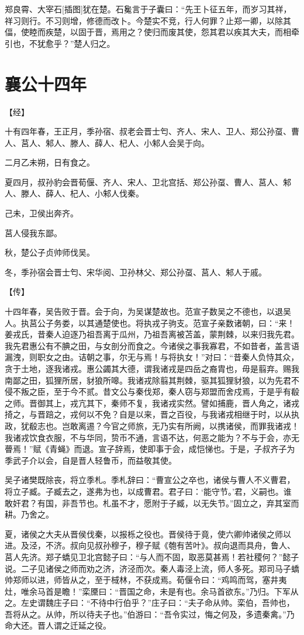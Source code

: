 \documentclass[a4paper,12pt,UTF8,twoside]{ctexbook}
\begin{document}
郑良霄、大宰石[插图]犹在楚。石毚言于子囊曰：“先王卜征五年，而岁习其祥，祥习则行。不习则增，修德而改卜。今楚实不竞，行人何罪？止郑一卿，以除其偪，使睦而疾楚，以固于晋，焉用之？使归而废其使，怨其君以疾其大夫，而相牵引也，不犹愈乎？”楚人归之。

\section{襄公十四年}


【经】

十有四年春，王正月，季孙宿、叔老会晋士匄、齐人、宋人、卫人、郑公孙虿、曹人、莒人、邾人、滕人、薛人、杞人、小邾人会吴于向。

二月乙未朔，日有食之。

夏四月，叔孙豹会晋荀偃、齐人、宋人、卫北宫括、郑公孙虿、曹人、莒人、邾人、滕人、薛人、杞人、小邾人伐秦。

己未，卫侯出奔齐。

莒人侵我东鄙。

秋，楚公子贞帅师伐吴。

冬，季孙宿会晋士匄、宋华阅、卫孙林父、郑公孙虿、莒人、邾人于戚。

【传】

十四年春，吴告败于晋。会于向，为吴谋楚故也。范宣子数吴之不德也，以退吴人。执莒公子务娄，以其通楚使也。将执戎子驹支。范宣子亲数诸朝，曰：“来！姜戎氏，昔秦人迫逐乃祖吾离于瓜州，乃祖吾离被苫盖，蒙荆棘，以来归我先君。我先君惠公有不腆之田，与女剖分而食之。今诸侯之事我寡君，不如昔者，盖言语漏洩，则职女之由。诘朝之事，尔无与焉！与将执女！”对曰：“昔秦人负恃其众，贪于土地，逐我诸戎。惠公蠲其大德，谓我诸戎是四岳之裔胄也，毋是翦弃。赐我南鄙之田，狐狸所居，豺狼所嗥。我诸戎除翦其荆棘，驱其狐狸豺狼，以为先君不侵不叛之臣，至于今不贰。昔文公与秦伐郑，秦人窃与郑盟而舍戍焉，于是乎有殽之师。晋御其上，戎亢其下，秦师不复，我诸戎实然。譬如捕鹿，晋人角之，诸戎掎之，与晋踣之，戎何以不免？自是以来，晋之百役，与我诸戎相继于时，以从执政，犹殽志也。岂敢离逷？今官之师旅，无乃实有所阙，以携诸侯，而罪我诸戎！我诸戎饮食衣服，不与华同，贽币不通，言语不达，何恶之能为？不与于会，亦无瞢焉！”赋《青蝇》而退。宣子辞焉，使即事于会，成恺悌也。于是，子叔齐子为季武子介以会，自是晋人轻鲁币，而益敬其使。

吴子诸樊既除丧，将立季札。季札辞曰：“曹宣公之卒也，诸侯与曹人不义曹君，将立子臧。子臧去之，遂弗为也，以成曹君。君子曰：‘能守节。’君，义嗣也。谁敢奸君？有国，非吾节也。札虽不才，愿附于子臧，以无失节。”固立之，弃其室而耕。乃舍之。

夏，诸侯之大夫从晋侯伐秦，以报栎之役也。晋侯待于竟，使六卿帅诸侯之师以进。及泾，不济。叔向见叔孙穆子，穆子赋《匏有苦叶》。叔向退而具舟，鲁人、莒人先济。郑子蟜见卫北宫懿子曰：“与人而不固，取恶莫甚焉！若社稷何？”懿子说。二子见诸侯之师而劝之济，济泾而次。秦人毒泾上流，师人多死。郑司马子蟜帅郑师以进，师皆从之，至于棫林，不获成焉。荀偃令曰：“鸡鸣而驾，塞井夷灶，唯余马首是瞻！”栾黡曰：“晋国之命，未是有也。余马首欲东。”乃归。下军从之。左史谓魏庄子曰：“不待中行伯乎？”庄子曰：“夫子命从帅。栾伯，吾帅也，吾将从之。从帅，所以待夫子也。”伯游曰：“吾令实过，悔之何及，多遗秦禽。”乃命大还。晋人谓之迁延之役。
\end{document}
